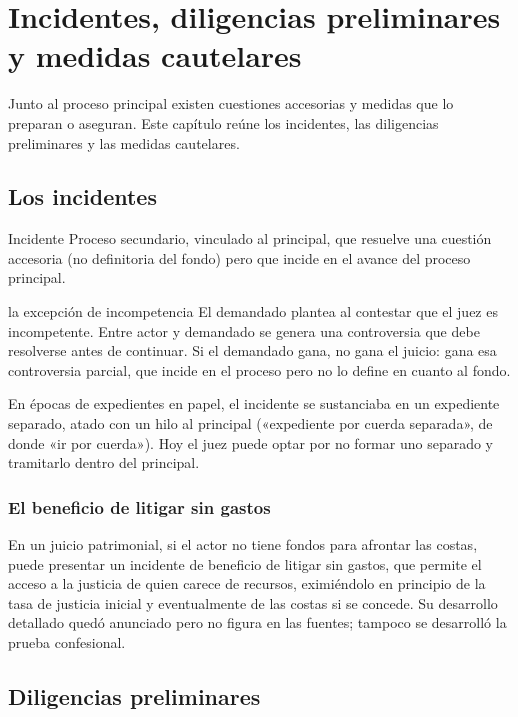 \documentclass[12pt,oneside]{book}
\begin{document}
\chapter{Incidentes, diligencias preliminares y medidas cautelares}\label{cap:incidentes}

Junto al proceso principal existen cuestiones accesorias y medidas que lo preparan o aseguran. Este capítulo reúne los incidentes, las diligencias preliminares y las medidas cautelares.

\section{Los incidentes}

\begin{definicion}{Incidente}
Proceso secundario, vinculado al principal, que resuelve una cuestión accesoria (no definitoria del fondo) pero que incide en el avance del proceso principal.
\end{definicion}

\begin{ejemplo}{la excepción de incompetencia}
El demandado plantea al contestar que el juez es incompetente. Entre actor y demandado se genera una controversia que debe resolverse antes de continuar. Si el demandado gana, no gana el juicio: gana esa controversia parcial, que incide en el proceso pero no lo define en cuanto al fondo.
\end{ejemplo}

En épocas de expedientes en papel, el incidente se sustanciaba en un expediente separado, atado con un hilo al principal («expediente por cuerda separada», de donde «ir por cuerda»). Hoy el juez puede optar por no formar uno separado y tramitarlo dentro del principal.

\subsection{El beneficio de litigar sin gastos}\label{sec:litigar-sin-gastos}

En un juicio patrimonial, si el actor no tiene fondos para afrontar las costas, puede presentar un incidente de beneficio de litigar sin gastos, que permite el acceso a la justicia de quien carece de recursos, eximiéndolo en principio de la tasa de justicia inicial y eventualmente de las costas si se concede. Su desarrollo detallado quedó anunciado pero no figura en las fuentes; tampoco se desarrolló la prueba confesional.

\section{Diligencias preliminares}
\end{document}
